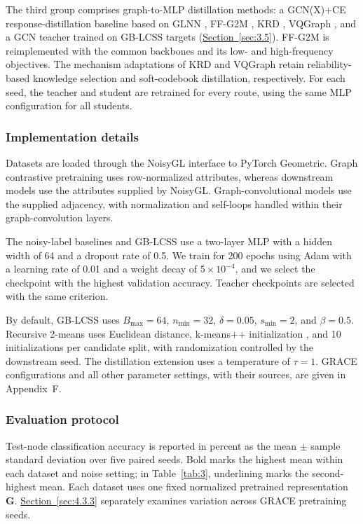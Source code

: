 \documentclass[10pt,letterpaper,nopreprintline]{elsarticle}
\theoremstyle{definition}
\theoremstyle{plain}
\begin{document}
The third group comprises graph-to-MLP distillation methods: a GCN(X)+CE response-distillation baseline based on GLNN \cite{ref4}, FF-G2M \cite{ref45}, KRD \cite{ref46}, VQGraph \cite{ref47}, and a GCN teacher trained on GB-LCSS targets (\hyperref[sec:3.5]{Section~\ref*{sec:3.5}}). FF-G2M is reimplemented with the common backbones and its low- and high-frequency objectives. The mechanism adaptations of KRD and VQGraph retain reliability-based knowledge selection and soft-codebook distillation, respectively. For each seed, the teacher and student are retrained for every route, using the same MLP configuration for all students.

\subsubsection{Implementation details}\label{sec:4.1.4}

Datasets are loaded through the NoisyGL interface to PyTorch Geometric. Graph contrastive pretraining uses row-normalized attributes, whereas downstream models use the attributes supplied by NoisyGL. Graph-convolutional models use the supplied adjacency, with normalization and self-loops handled within their graph-convolution layers.

The noisy-label baselines and GB-LCSS use a two-layer MLP with a hidden width of 64 and a dropout rate of 0.5. We train for 200 epochs using Adam with a learning rate of 0.01 and a weight decay of \(5 \times 10^{- 4}\), and we select the checkpoint with the highest validation accuracy. Teacher checkpoints are selected with the same criterion.

By default, GB-LCSS uses \(B_{\max} = 64\), \(n_{\min} = 32\), \(\delta = 0.05\), \(s_{\min} = 2\), and \(\beta = 0.5\). Recursive 2-means uses Euclidean distance, k-means++ initialization \cite{ref71}, and 10 initializations per candidate split, with randomization controlled by the downstream seed. The distillation extension uses a temperature of \(\tau = 1\). GRACE configurations and all other parameter settings, with their sources, are given in Appendix~F.

\subsubsection{Evaluation protocol}\label{sec:4.1.5}

Test-node classification accuracy is reported in percent as the mean \ensuremath{\pm} sample standard deviation over five paired seeds. Bold marks the highest mean within each dataset and noise setting; in Table~\ref{tab:3}, underlining marks the second-highest mean. Each dataset uses one fixed normalized pretrained representation \(\mathbf G\). \hyperref[sec:4.3.3]{Section~\ref*{sec:4.3.3}} separately examines variation across GRACE pretraining seeds.
\end{document}
